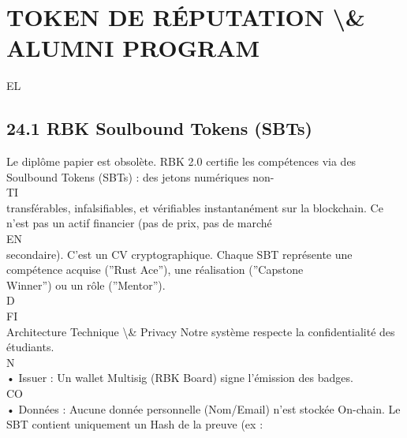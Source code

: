\section{TOKEN DE RÉPUTATION \textbackslash{}& ALUMNI PROGRAM}
\vspace{0.5em}
\vspace{0.5em}
\vspace{0.5em}
\vspace{0.5em}
EL\\
\subsection{24.1 RBK Soulbound Tokens (SBTs)}
Le diplôme papier est obsolète. RBK 2.0 certifie les compétences via des Soulbound Tokens (SBTs) : des jetons numériques non-\\
\vspace{0.5em}
\vspace{0.5em}
\vspace{0.5em}
\vspace{0.5em}
TI\\
transférables, infalsifiables, et vérifiables instantanément sur la blockchain. Ce n’est pas un actif financier (pas de prix, pas de marché\\
\vspace{0.5em}
\vspace{0.5em}
\vspace{0.5em}
\vspace{0.5em}
EN\\
secondaire). C’est un CV cryptographique. Chaque SBT représente une compétence acquise (”Rust Ace”), une réalisation (”Capstone\\
Winner”) ou un rôle (”Mentor”).\\
\vspace{0.5em}
\vspace{0.5em}
\vspace{0.5em}
\vspace{0.5em}
D\\
FI\\
Architecture Technique \textbackslash{}& Privacy       Notre système respecte la confidentialité des étudiants.\\
\vspace{0.5em}
N\\
• Issuer : Un wallet Multisig (RBK Board) signe l’émission des badges.\\
CO\\
• Données : Aucune donnée personnelle (Nom/Email) n’est stockée On-chain. Le SBT contient uniquement un Hash de la preuve (ex :\\
